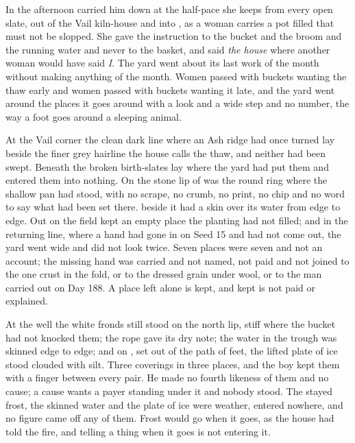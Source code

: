 \scenebreak

In the afternoon  carried him down at the half-pace she keeps from every open slate, out of the Vail kiln-house and into , as a woman carries a pot filled that must not be slopped. She gave the instruction to the bucket and the broom and the running water and never to the basket, and said \emph{the house} where another woman would have said \emph{I}. The yard went about its last work of the month without making anything of the month. Women passed with buckets wanting the thaw early and women passed with buckets wanting it late, and the yard went around the places it goes around with a look and a wide step and no number, the way a foot goes around a sleeping animal.

At the Vail corner the clean dark line where an Ash ridge had once turned lay beside the finer grey hairline the house calls the thaw, and neither had been swept. Beneath  the broken birth-slates lay where the yard had put them and entered them into nothing. On the stone lip of  was the round ring where the shallow pan had stood, with no scrape, no crumb, no print, no chip and no word to say what had been set there.  beside it had a skin over its water from edge to edge. Out on  the field kept an empty place the planting had not filled; and in the returning line, where a hand had gone in on Seed 15 and had not come out, the yard went wide and did not look twice. Seven places were seven and not an account; the missing hand was carried and not named, not paid and not joined to the one crust in the fold, or to the dressed grain under wool, or to the man carried out on Day 188. A place left alone is kept, and kept is not paid or explained.

At the well the white fronds still stood on the north lip, stiff where the bucket had not knocked them; the rope gave its dry note; the water in the trough was skinned edge to edge; and on , set out of the path of feet, the lifted plate of ice stood clouded with silt. Three coverings in three places, and the boy kept them with a finger between every pair. He made no fourth likeness of them and no cause; a cause wants a payer standing under it and nobody stood. The stayed frost, the skinned water and the plate of ice were weather, entered nowhere, and no figure came off any of them. Frost would go when it goes, as the house had told the fire, and telling a thing when it goes is not entering it.

